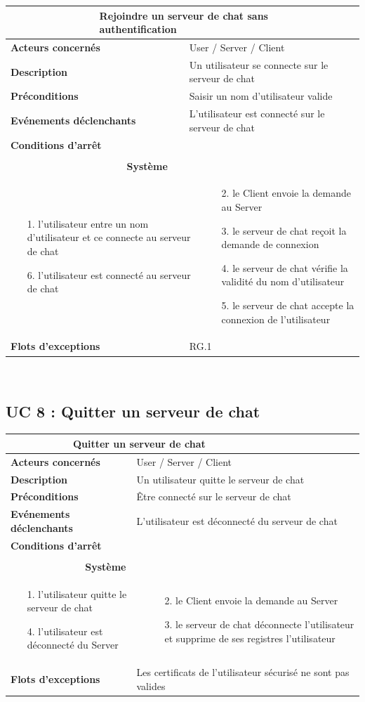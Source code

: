 \documentclass[a4paper,11pt,french]{article}
\newcommand{\fiche}[9] {
	\noindent
\begin{tabular}{|p{3.5cm}| p{1cm} | p{3cm} | p{.5cm} | p{7cm}|} 
\hline
\rowcolor{blue}
\multicolumn{2}{|l|}{\color{white}\bfseries{Nom}} & \multicolumn{3}{l|}{\color{white}\bfseries{#1}}\\
\hline
\multicolumn{2}{|l|}{\bfseries{Acteurs concernés}} & \multicolumn{3}{m{10.5cm}|}{#2}\\
\hline
\multicolumn{2}{|l|}{\bfseries{Description}} & \multicolumn{3}{m{10.5cm}|}{#3}\\
\hline
\multicolumn{2}{|l|}{\bfseries{Préconditions}} & \multicolumn{3}{m{10.5cm}|}{#4}\\
\hline
\multicolumn{2}{|l|}{\bfseries{Evénements déclenchants}} & \multicolumn{3}{m{10.5cm}|}{#5}\\
\hline
\multicolumn{2}{|l|}{\bfseries{Conditions d'arrêt}} & \multicolumn{3}{m{10.5cm}|}{#6}\\
\hline
\rowcolor{gray}
\multicolumn{5}{|c|}{\bfseries{Description du flot d'événements principal}}\\
\hline
\rowcolor{gray}
\multicolumn{3}{|c|}{\bfseries{Acteur(s)}} & \multicolumn{2}{c|}{\bfseries{Système}}\\
\hline
\multicolumn{3}{|p{7.5cm}|}{#7} & \multicolumn{2}{p{7.5cm}|}{#8}\\
\hline
\multicolumn{2}{|l}{\bfseries{Flots d'exceptions}} & \multicolumn{3}{|p{11.5cm}|}{#9}\\
\hline
\end{tabular}
\\
}
\begin{document}
\fiche
	{Rejoindre un serveur de chat sans authentification} %
	{User / Server / Client} %
	{Un utilisateur se connecte sur le serveur de chat} %
	{Saisir un nom d’utilisateur valide} %
	{L’utilisateur est connecté sur le serveur de chat} %
	{} %
	{\begin{itemize}  %
		\item [1.] l’utilisateur entre un nom d’utilisateur et ce connecte au serveur de chat
		\item[]  
		\item[]  
		\item[]  
		\item[]  
		\item[]  
		\item[]  
		\item [6.] l’utilisateur est connecté au serveur de chat
	 \end{itemize}
	} 
	{\begin{itemize}  %
		\item []
		\item []
		\item [2.] le Client envoie la demande au Server
		\item [3.] le serveur de chat reçoit la demande de connexion
		\item [4.] le serveur de chat vérifie la validité du nom d’utilisateur
		\item [5.] le serveur de chat accepte la connexion de l’utilisateur 
	 \end{itemize}
	 }
	{RG.1} %

\subsection{UC 8 : Quitter un serveur de chat}

\fiche
	{Quitter un serveur de chat} %
	{User / Server / Client} %
	{Un utilisateur quitte le serveur de chat} %
	{Être connecté sur le serveur de chat } %
	{L’utilisateur est déconnecté du serveur de chat} %
	{} %
	{\begin{itemize}  %
		\item [1.] l’utilisateur quitte le serveur de chat
		\item []  
		\item []
		\item [4.] l’utilisateur est déconnecté du Server
	 \end{itemize}
	} 
	{\begin{itemize}  %
		\item []
		\item [2.] le Client envoie la demande au Server
		\item [3.] le serveur de chat déconnecte l’utilisateur et supprime de ses registres l’utilisateur
	 \end{itemize}
	 }
	{Les certificats de l’utilisateur sécurisé ne sont pas valides} %
\end{document}

